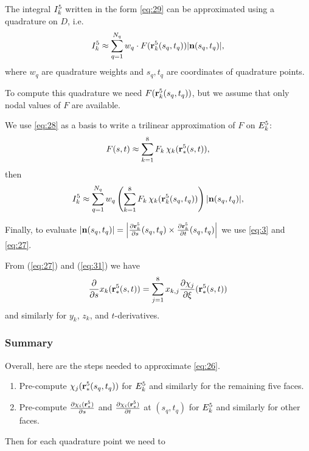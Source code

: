 \documentclass[11pt]{article}
\begin{document}
The integral $I_{k}^{5}$ written in the form \eqref{eq:29} can be approximated
using a quadrature on $D$, i.e.
\begin{equation}
\label{eq:32}
I_{k}^{5} \approx \sum_{q=1}^{N_{q}} w_{q}\cdot F(\mathbf{r}_{k}^{5}(s_{q}, t_{q})) | \mathbf{n}(s_{q},t_{q}) |,
\end{equation}
where $w_{q}$ are quadrature weights and $s_{q}, t_{q}$ are
coordinates of quadrature points.

To compute this quadrature we need $F(\mathbf{r}_{k}^{5}(s_{q}, t_{q}))$, but we
assume that only nodal values of $F$ are available.

We use \eqref{eq:28} as a basis to write a trilinear approximation of $F$ on $E_{k}^{5}$:
\begin{equation}
\label{eq:33}
F(s,t) \approx \sum_{k=1}^{8} F_{k}\,\chi_{k}(\mathbf{r}_{*}^{5}(s,t)),
\end{equation}
then
\begin{equation}
\label{eq:34}
I_{k}^{5} \approx \sum_{q=1}^{N_{q}} w_{q}\left( \sum_{k=1}^{8} F_{k}\,\chi_{k}(\mathbf{r}_{k}^{5}(s_q, t_q)) \right) | \mathbf{n}(s_{q},t_{q}) |,
\end{equation}

Finally, to evaluate $|\mathbf{n}(s_{q}, t_{q})| = \left| \frac{\partial \mathbf{r}_{k}^{5}}{\partial s}(s_{q}, t_{q}) \times
\frac{\partial \mathbf{r}_{k}^{5}}{\partial t}(s_{q}, t_{q}) \right|$ we use \eqref{eq:3} and \eqref{eq:27}.

From (\ref{eq:27}) and (\ref{eq:31}) we have
\begin{equation}
  \label{eq:35}
  \frac{\partial }{\partial s}x_{k}(\mathbf{r}_{*}^{5}(s,t)) = \sum_{j=1}^{8}x_{k,j}\frac{\partial \chi_{j}}{\partial \xi}(\mathbf{r}_{*}^{5}(s,t))
\end{equation}
and similarly for $y_{k}$, $z_{k}$, and $t$-derivatives.

\subsubsection{Summary}
\label{sec:summary}

Overall, here are the steps needed to approximate \eqref{eq:26}.

\begin{enumerate}
\item Pre-compute $\chi_{j}(\mathbf{r}_{*}^{5}(s_{q}, t_{q}))$ for $E_{k}^{5}$ and similarly
for the remaining five faces.
\item Pre-compute $\frac{\partial \chi_{i}(\mathbf{r}_{*}^{5})}{\partial s}$ and
$\frac{\partial \chi_{i}(\mathbf{r}_{*}^{5})}{\partial t}$ at $(s_{q}, t_{q})$ for $E_{k}^{5}$ and similarly for
other faces.
\end{enumerate}

Then for each quadrature point we need to
\end{document}
